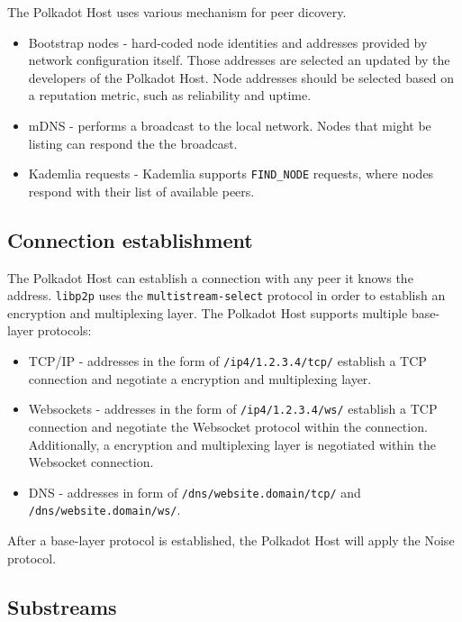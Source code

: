 \documentclass{book}
\begin{document}
The Polkadot Host uses various mechanism for peer dicovery.

\begin{itemize}
    \item Bootstrap nodes - hard-coded node identities and addresses provided by
    network configuration itself. Those addresses are selected an updated by the
    developers of the Polkadot Host. Node addresses should be selected based on
    a reputation metric, such as reliability and uptime.
    \item mDNS - performs a broadcast to the local network. Nodes that might be
    listing can respond the the broadcast.
    \item Kademlia requests - Kademlia supports \verb|FIND_NODE| requests, where
    nodes respond with their list of available peers.
\end{itemize}

\subsection{Connection establishment}

The Polkadot Host can establish a connection with any peer it knows the address.
\verb|libp2p| uses the \verb|multistream-select| protocol in order to establish
an encryption and multiplexing layer. The Polkadot Host supports multiple
base-layer protocols:

\begin{itemize}
    \item TCP/IP - addresses in the form of \verb|/ip4/1.2.3.4/tcp/| establish a
    TCP connection and negotiate a encryption and multiplexing layer.
    \item Websockets - addresses in the form of \verb|/ip4/1.2.3.4/ws/|
    establish a TCP connection and negotiate the Websocket protocol within the
    connection. Additionally, a encryption and multiplexing layer is negotiated
    within the Websocket connection.
    \item DNS - addresses in form of \verb|/dns/website.domain/tcp/| and
    \verb|/dns/website.domain/ws/|.
\end{itemize}

After a base-layer protocol is established, the Polkadot Host will apply the
Noise protocol.

\subsection{Substreams}
\end{document}
